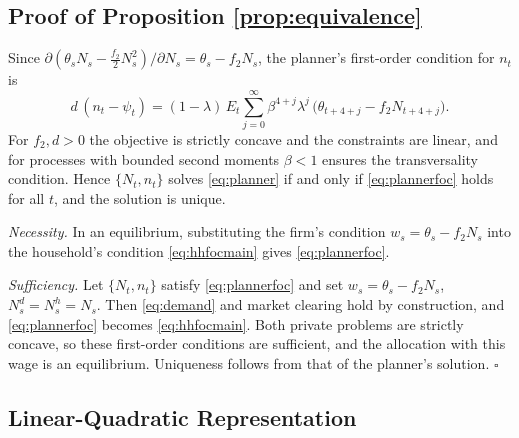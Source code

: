 \documentclass[12pt]{article}
\begin{document}
\subsection{Proof of Proposition \ref{prop:equivalence}}\label{app:equivalence}

Since $\partial(\theta_s N_s - \tfrac{f_2}{2}N_s^{2})/\partial N_s = \theta_s - f_2 N_s$, the planner's first-order condition for $n_t$ is
\begin{equation}\label{eq:plannerfoc}
  d\,(n_t - \psi_t) = (1-\lambda)\, E_t \sum_{j=0}^{\infty} \beta^{4+j}\lambda^{j}\,\big(\theta_{t+4+j} - f_2 N_{t+4+j}\big) .
\end{equation}
For $f_2, d > 0$ the objective is strictly concave and the constraints are linear, and for processes with bounded second moments $\beta < 1$ ensures the transversality condition. Hence $\{N_t, n_t\}$ solves \eqref{eq:planner} if and only if \eqref{eq:plannerfoc} holds for all $t$, and the solution is unique.

\textit{Necessity.} In an equilibrium, substituting the firm's condition $w_s = \theta_s - f_2 N_s$ into the household's condition \eqref{eq:hhfocmain} gives \eqref{eq:plannerfoc}.

\textit{Sufficiency.} Let $\{N_t, n_t\}$ satisfy \eqref{eq:plannerfoc} and set $w_s = \theta_s - f_2 N_s$, $N^{d}_s = N^{h}_s = N_s$. Then \eqref{eq:demand} and market clearing hold by construction, and \eqref{eq:plannerfoc} becomes \eqref{eq:hhfocmain}. Both private problems are strictly concave, so these first-order conditions are sufficient, and the allocation with this wage is an equilibrium. Uniqueness follows from that of the planner's solution. \hfill$\square$

\subsection{Linear-Quadratic Representation}\label{app:lq}
\end{document}
